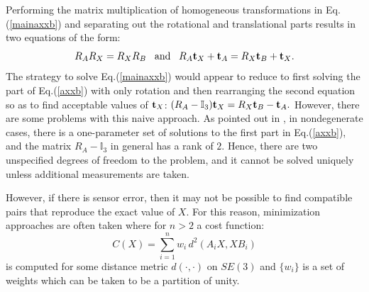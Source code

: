 \documentclass[twocolumn,10pt]{asme2ej}
\begin{document}
Performing the matrix multiplication of homogeneous transformations in Eq.(\ref{mainaxxb}) and separating out the rotational and translational parts results in two equations of the form:
\begin{equation}
R_A R_X = R_X R_B {\rm \,\,\,\,\, and \,\,\,\,\,} R_A {\bf t}_X + {\bf t}_A = R_X {\bf t}_B + {\bf t}_X.
\label{axxb}
\end{equation}
The strategy to solve Eq.(\ref{mainaxxb}) would appear to reduce to first solving the part of Eq.(\ref{axxb}) with only rotation and then rearranging the second equation so as to find acceptable values of ${\bf t}_X$: $ (R_A - \mathbb{I}_{3}) {\bf t}_X = R_X {\bf t}_B - {\bf t}_A. $ However, there are some problems with this naive approach. As pointed out in \cite{park1994robot,shiu1989calibration}, in nondegenerate cases, there is a one-parameter set of solutions to the first part in Eq.(\ref{axxb}), and the matrix $R_A - \mathbb{I}_{3}$ in general has a rank of $2$. Hence, there are two unspecified degrees of freedom to the
problem, and it cannot be solved uniquely unless additional measurements are taken.

However, if there is sensor error, then it may not be possible to find compatible pairs that reproduce the exact value of $X$. For this reason, minimization approaches are often taken where for $n>2$ a cost function:
\begin{equation}
C(X) = \sum_{i=1}^{n} w_i \, d^2(A_i X,X B_i)
\label{mainaxxb2}
\end{equation}
is computed for some distance metric $d(\cdot,\cdot)$ on $SE(3)$ and $\{w_i\}$ is a set of weights which can be taken to be a partition of unity. 
\end{document}
